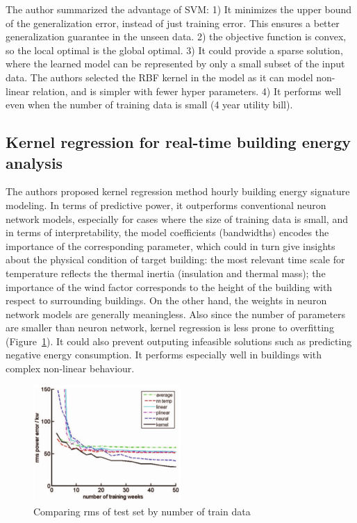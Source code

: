 \documentclass[12pt]{article}
\newcommand{\fref}[1]{Figure~\ref{#1}}
\begin{document}
The author summarized the advantage of SVM: 1) It
minimizes the upper bound of the generalization error, instead of just
training error. This ensures a better generalization guarantee in the
unseen data. 2) the objective function is convex, so the local optimal
is the global optimal. 3) It could provide a sparse solution, where
the learned model can be represented by only a small subset of the
input data. The authors selected the RBF kernel in the model as it can
model non-linear relation, and is simpler with fewer hyper
parameters. 4) It performs well even when the number of training data
is small (4 year utility bill).

\subsection{Kernel regression for real-time building energy
  analysis~\cite{brown2012kernel}}
The authors proposed kernel regression method hourly building energy
signature modeling. In terms of predictive power, it outperforms
conventional neuron network models, especially for cases where the
size of training data is small, and in terms of interpretability, the
model coefficients (bandwidths) encodes the importance of the
corresponding parameter, which could in turn give insights about the
physical condition of target building: the most relevant time scale
for temperature reflects the thermal inertia (insulation and thermal
mass); the importance of the wind factor corresponds to the height of
the building with respect to surrounding buildings. On the other hand,
the weights in neuron network models are generally meaningless. Also
since the number of parameters are smaller than neuron network, kernel
regression is less prone to overfitting (\fref{fig:overfitKernel}). It
could also prevent outputing infeasible solutions such as predicting
negative energy consumption. It performs especially well in buildings
with complex non-linear behaviour.
\begin{figure}[h!]
  \centering
  \includegraphics[width=0.5\textwidth]{images/overfitKernel.png}
  \caption{Comparing rms of test set by number of train data}
  \label{fig:overfitKernel}
\end{figure}
\end{document}
